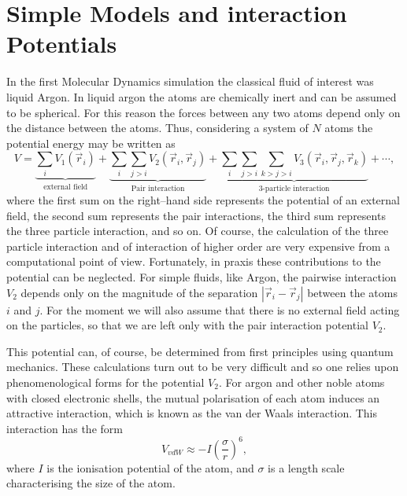 \section{Simple Models and interaction Potentials}
In the first Molecular Dynamics simulation the classical fluid of interest was
liquid Argon. In liquid argon the atoms are chemically inert and can be
assumed to be spherical. For this reason the forces between any two atoms 
depend only on the distance between the atoms. Thus, considering a system of
$N$ atoms the potential energy may be written as
\begin{displaymath}
  V =  \underbrace{\sum_i V_1(\vec{r}_i)}_{\textrm{external field}} + 
       \underbrace{\sum_{i}\sum_{j>i} V_2(\vec{r}_i,\vec{r}_j)}_{
            \textrm{Pair interaction}} +
       \underbrace{\sum_{i} \sum_{j>i} \sum_{k>j>i} V_3(\vec{r}_i,\vec{r}_j,
        \vec{r}_k)}_{\textrm{3-particle interaction}}
       + \cdots,
\end{displaymath}
where the first sum on the right--hand side represents the potential of an
external field, the second sum represents the pair interactions, the 
third sum represents the three particle interaction, and so on. Of course, the
calculation of the three particle interaction and of interaction of higher
order are very expensive from a computational point of view. Fortunately, in
praxis these contributions to the potential can be neglected. For simple
fluids, like Argon, the pairwise
interaction $V_2$ depends only on the magnitude of the separation 
$|\vec{r}_i - \vec{r}_j|$ between the atoms $i$ and $j$. For the moment we
will also assume that there is no external field acting on the particles, so
that we are left only with the pair interaction potential $V_2$.

This potential can, of course, be determined from first principles using
quantum mechanics. These calculations turn out to be very difficult and so one
relies upon phenomenological forms for the potential $V_2$. For argon and other
noble atoms with closed electronic shells, the mutual polarisation of each
atom induces an attractive interaction, which is known as the van der Waals
interaction. This interaction has the form
\begin{displaymath}
  V_{vdW} \approx -I \left( \frac{\sigma}{r}\right)^6,
\end{displaymath}
where $I$ is the ionisation potential of the atom, and $\sigma$ is a
length scale characterising the size of the atom. 

